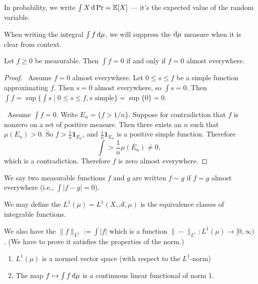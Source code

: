 \begin{node}
In probability, we write $\int X\,\mathrm{d}\Pr=\mathbb{E}[X]$ --- it's the
expected value of the random variable.
\end{node}

\begin{notation}
When writing the integral $\int f\,\mathrm{d}\mu$, we will suppress the
$\mathrm{d}\mu$ measure when it is clear from context.
\end{notation}

\begin{proposition}
Let $f\geq0$ be measurable. Then $\int f=0$ if and only if $f=0$
almost everywhere.
\end{proposition}

\begin{proof}
\backwardproof\ Assume $f=0$ almost everywhere. Let $0\leq s\leq f$ be
a simple function approximating $f$. Then $s=0$ almost everywhere, so
$\int s=0$. Then $\int f=\sup\{\int s\mid 0\leq s\leq f, s\mbox{ simple}\}=\sup\{0\}=0$.

\forwardproof\ Assume $\int f=0$. Write $E_{n}=\{f>1/n\}$. Suppose for
contradiction that $f$ is nonzero on a set of positive measure. Then
there exists an $n$ such that $\mu(E_{n})>0$. So $f>\frac{1}{n}\mathbf{1}_{E_{n}}$,
and $\frac{1}{n}\mathbf{1}_{E_{n}}$ is a positive simple
function. Therefore
\begin{equation}
\int>\frac{1}{n}\mu(E_{n})\neq0,
\end{equation}
which is a contradiction. Therefore $f$ is zero almost everywhere.
\end{proof}

\begin{definition}
We say two measurable functions $f$ and $g$ are 
written $f\sim g$ if $f=g$ almost everywhere (i.e., $\int|f-g|=0$).
\end{definition}

\begin{definition}
We may define the  $L^{1}(\mu)=L^{1}(X,\mathcal{A},\mu)$
is the equivalence classes of integrable functions.

We also have the  $\|f\|_{L^{1}}:=\int|f|$ which
is a function $\|-\|_{L^{1}}\colon L^{1}(\mu)\to[0,\infty)$. (We have
  to prove it satisfies the properties of the norm.)
\end{definition}

\begin{theorem}
\begin{enumerate}
\item $L^{1}(\mu)$ is a normed vector space (with respect to the $L^{1}$-norm)
\item The map $f\mapsto\int f\,\mathrm{d}\mu$ is a continuous linear
  functional of norm 1.
\end{enumerate}
\end{theorem}

